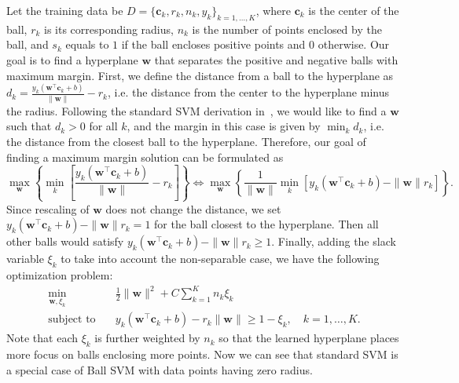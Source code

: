 \documentclass[12pt]{article}
\newcommand{\bc}{\mathbf{c}}
\newcommand{\bw}{\mathbf{w}}
\begin{document}
Let the training data be $D = \{\bc_k, r_k, n_k, y_k\}_{k=1,\ldots,K}$, where $\bc_k$ is the center of the ball, $r_k$ is its corresponding radius, $n_k$ is the number of points enclosed by the ball, and $s_k$ equals to $1$ if the ball encloses positive points and $0$ otherwise. Our goal is to find a hyperplane $\bw$ that separates the positive and negative balls with maximum margin. First, we define the distance from a ball to the hyperplane as $d_k = \frac{y_k(\bw^{\top}\bc_k + b)}{\|\bw\|} - r_k$, i.e. the distance from the center to the hyperplane minus the radius.  Following the standard SVM derivation in~\cite{prml}, we would like to find a $\bw$ such that $d_k > 0$ for all $k$, and the margin in this case is given by $\min_k d_k$, i.e. the distance from the closest ball to the hyperplane. Therefore, our goal of finding a maximum margin solution can be formulated as
\begin{equation}
\max_{\bw}\left\{\min_k\left[\frac{y_k(\bw^{\top}\bc_k + b)}{\|\bw\|} - r_k\right]\right\} \Longleftrightarrow \max_{\bw}\left\{\frac{1}{\|\bw\|}\min_k\left[y_k(\bw^{\top}\bc_k + b) - \|\bw\|r_k\right]\right\}.
\end{equation}
Since rescaling of $\bw$ does not change the distance, we set $y_k(\bw^{\top}\bc_k + b) - \|\bw\|r_k = 1$ for the ball closest to the hyperplane. Then all other balls would satisfy $y_k(\bw^{\top}\bc_k + b) - \|\bw\|r_k \ge 1$. Finally, adding the slack variable $\xi_k$ to take into account the non-separable case, we have the following optimization problem:
\begin{align}
\min_{\bw, \xi_k} &\quad\frac{1}{2} \| \bw \|^2 + C \sum_{k=1}^K n_k \xi_k \nonumber\\
\text{subject to} &\quad y_k(\bw^{\top}\bc_k + b) - r_k\|\bw\| \ge 1 - \xi_k, \quad k = 1, \ldots, K.
\end{align}
Note that each $\xi_k$ is further weighted by $n_k$ so that the learned hyperplane places more focus on balls enclosing more points. Now we can see that standard SVM is a special case of Ball SVM with data points having zero radius.
\end{document}
